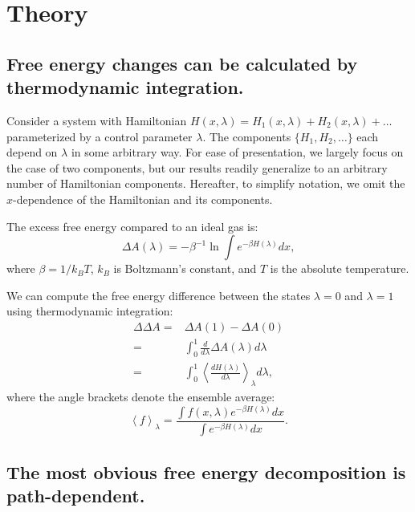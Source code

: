 \documentclass{article}
\begin{document}
\section{Theory}

\subsection{Free energy changes can be calculated by thermodynamic integration.}

Consider a system with Hamiltonian $H(x, \lambda) = H_1(x, \lambda) + H_2(x, \lambda) + \ldots$ parameterized by a control parameter $\lambda$. The components $\{H_1, H_2, \ldots\}$ each depend on $\lambda$ in some arbitrary way. For ease of presentation, we largely focus on the case of two components, but our results readily generalize to an arbitrary number of Hamiltonian components. Hereafter, to simplify notation, we omit the $x$-dependence of the Hamiltonian and its components.

The excess free energy compared to an ideal gas is:
\begin{equation}\label{eq:dA}
\Delta A(\lambda) = -\beta^{-1} \ln \int e^{-\beta H(\lambda)} dx,
\end{equation}
where $\beta=1/k_BT$, $k_B$ is Boltzmann's constant, and $T$ is the absolute temperature.

We can compute the free energy difference between the states $\lambda=0$ and $\lambda=1$ using thermodynamic integration:
\begin{align}
\Delta\Delta A =& \Delta A(1) - \Delta A(0) \nonumber\\
               =& \int_0^1 \frac{d}{d\lambda} \Delta A(\lambda) d\lambda \nonumber\\
               =& \int_0^1 \left\langle \frac{dH(\lambda)}{d\lambda}\right\rangle_\lambda 
                d\lambda \label{eq:TI},
\end{align}
where the angle brackets denote the ensemble average:
\begin{equation}
\left\langle f \right\rangle_\lambda = \frac
	{\int f(x, \lambda) e^{-\beta H(\lambda)} dx}
    {\int e^{-\beta H(\lambda)} dx}.
\end{equation}




\subsection{The most obvious free energy decomposition is path-dependent.}
\end{document}
